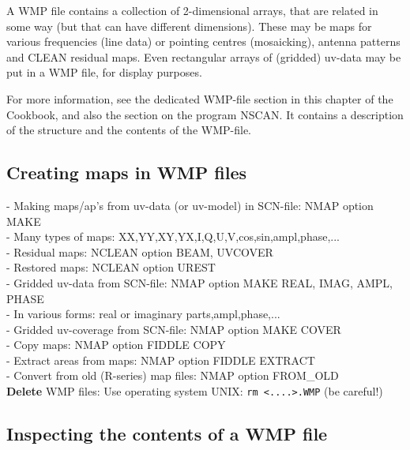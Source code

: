 	A WMP file contains a collection of 2-dimensional arrays, that are
related in some way (but that can have different dimensions).  These may be
maps for various frequencies (line data) or pointing centres 
(mosaicking), antenna patterns and CLEAN residual maps.  Even rectangular
arrays of (gridded) uv-data may be put in a WMP file, for display purposes. 

	For more information, see the dedicated WMP-file section in this
chapter of the Cookbook, and also the section on the program NSCAN.  It
contains a description of the structure and the contents of the 
WMP-file. 


\subsection{Creating maps in WMP files} 
\label{wmp.create} 

- Making maps/ap's from uv-data (or uv-model) in SCN-file: NMAP option MAKE\\ 
\hspace*{5mm} - Many types of maps:
XX,YY,XY,YX,I,Q,U,V,cos,sin,ampl,phase,...\\ 
- Residual maps: NCLEAN option BEAM, UVCOVER\\ 
- Restored maps: NCLEAN option UREST\\ 
- Gridded uv-data from SCN-file: NMAP option MAKE REAL, IMAG, AMPL, PHASE\\ 
\hspace*{5mm} - In various forms: real or imaginary parts,ampl,phase,...\\ 
- Gridded uv-coverage from SCN-file: NMAP option MAKE COVER\\ 
- Copy maps: NMAP option FIDDLE COPY\\ 
- Extract areas from maps: NMAP option FIDDLE EXTRACT\\ 
- Convert from old (R-series) map files: NMAP option FROM\_OLD\\ 

{\bf Delete} WMP files: 
Use operating system UNIX: {\tt rm <....>.WMP} (be careful!) 


\subsection{Inspecting the contents of a WMP file} 
\label{wmp.inspect} 

